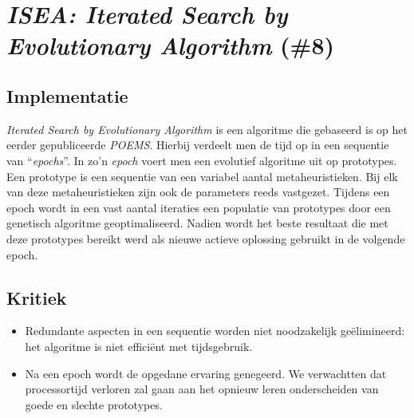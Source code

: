 \section{\emph{ISEA: Iterated Search by Evolutionary Algorithm} (\#8)}
\label{sss:isea}
\subsection{Implementatie}
\emph{Iterated Search by Evolutionary Algorithm}\cite{chesc-isea} is een algoritme die gebaseerd is op het eerder gepubliceerde \emph{POEMS}\cite{eurogp06:KubalikFaigl}. Hierbij verdeelt men de tijd op in een sequentie van ``\emph{epochs}''. In zo'n \emph{epoch} voert men een evolutief algoritme uit op prototypes. Een prototype is een sequentie van een variabel aantal metaheuristieken. Bij elk van deze metaheuristieken zijn ook de parameters reeds vastgezet. Tijdens een epoch wordt in een vast aantal iteraties een populatie van prototypes door een genetisch algoritme geoptimaliseerd. Nadien wordt het beste resultaat die met deze prototypes bereikt werd als nieuwe actieve oplossing gebruikt in de volgende epoch. 
\subsection{Kritiek}
\begin{itemize}
 \item Redundante aspecten in een sequentie worden niet noodzakelijk ge\"elimineerd: het algoritme is niet effici\"ent met tijdsgebruik.
 \item Na een epoch wordt de opgedane ervaring genegeerd. We verwachtten dat processortijd verloren zal gaan aan het opnieuw leren onderscheiden van goede en slechte prototypes.
\end{itemize}